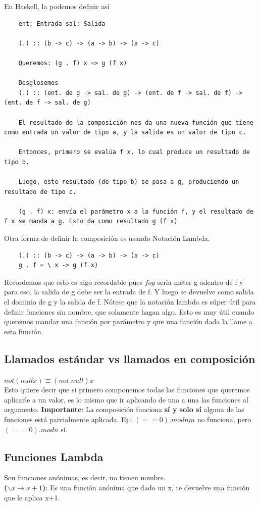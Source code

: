 \documentclass[10pt,a4paper]{article}
\begin{document}
En Haskell, la podemos definir así
\begin{lstlisting}
    ent: Entrada sal: Salida

    (.) :: (b -> c) -> (a -> b) -> (a -> c)
    
    Queremos: (g . f) x => g (f x) 

    Desglosemos
    (.) :: (ent. de g -> sal. de g) -> (ent. de f -> sal. de f) -> (ent. de f -> sal. de g)
    
    El resultado de la composición nos da una nueva función que tiene como entrada un valor de tipo a, y la salida es un valor de tipo c.
    
    Entonces, primero se evalúa f x, lo cual produce un resultado de tipo b.
    
    Luego, este resultado (de tipo b) se pasa a g, produciendo un resultado de tipo c.
  
    (g . f) x: envía el parámetro x a la función f, y el resultado de f x se manda a g. Esto da como resultado g (f x)
\end{lstlisting}
Otra forma de definir la composición es usando Notación Lambda.
\begin{lstlisting}
    (.) :: (b -> c) -> (a -> b) -> (a -> c)
    g . f = \ x -> g (f x)
\end{lstlisting}
Recordemos que esto es algo recordable pues $fog$ seria meter g adentro de f y para eso, la salida de g debe ser la entrada de f. Y luego se devuelve como salida el dominio de g y la salida de f.
Nótese que la notación lambda es súper útil para definir funciones sin nombre, que solamente hagan algo. Esto es muy útil cuando queremos mandar una función por parámetro y que una función dada la llame a esta función.
\subsection*{Llamados estándar vs llamados en composición}
$not(null x) \equiv (not . null) x$ \\
Esto quiere decir que si primero componemos todas las funciones que queremos aplicarle a un valor, es lo mismo que ir aplicando de una a una las funciones al argumento.
\textbf{Importante}: La composición funciona \textbf{sí y solo sí} alguna de las funciones está parcialmente aplicada. Ej.: $(== 0) . mod n m$ no funciona, pero $(== 0) . mod n$ sí.
\subsection*{Funciones Lambda}
Son funciones anónimas, es decir, no tienen nombre.  \\
\textbf{($\backslash x \rightarrow x+1$)}: Es una función anónima que dado un x, te devuelve una función que le aplica x+1.
\end{document}
